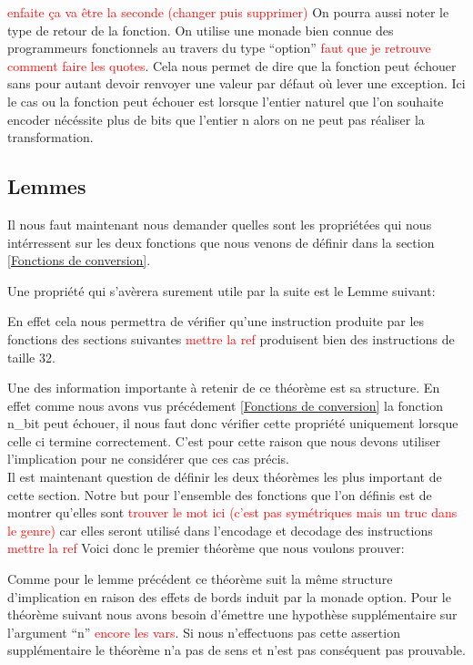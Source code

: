 \documentclass {article}
\newcommand{\codefrom}[3]
           {}
\theoremstyle{definition}
\theoremstyle{remark}
\newcommand{\todo}[1]{\textcolor{red}{#1}}
\begin{document}
\todo{enfaite ça va être la seconde (changer puis supprimer)}
On pourra aussi noter le type de retour de la fonction.
On utilise une monade bien connue des programmeurs fonctionnels au travers du type
``option'' \todo{faut que je retrouve comment faire les quotes}. Cela nous permet de
dire que la fonction peut échouer sans pour autant devoir renvoyer une valeur par
défaut où lever une exception. Ici le cas ou la fonction peut échouer est lorsque
l'entier naturel que l'on souhaite encoder nécéssite plus de bits que l'entier n alors
on ne peut pas réaliser la transformation.





\subsection{Lemmes}

Il nous faut maintenant nous demander quelles sont les propriétées qui nous intérressent sur
les deux fonctions que nous venons de définir dans la section \ref{Fonctions de conversion}.

Une propriété qui s'avèrera surement utile par la suite est le Lemme suivant:

En effet cela nous permettra de vérifier qu'une instruction produite par les fonctions
des sections suivantes \todo{mettre la ref} produisent bien des instructions de taille 32.

\codefrom{src}{binary}{size_n_bit}

Une des information importante à retenir de ce théorème est sa structure.
En effet comme nous avons vus précédement \ref{Fonctions de conversion} la
fonction n\_bit peut échouer, il nous faut donc vérifier cette propriété
uniquement lorsque celle ci termine correctement. C'est pour cette raison
que nous devons utiliser l'implication pour ne considérer que ces cas précis. \\

Il est maintenant question de définir les deux théorèmes les plus important de
cette section. Notre but pour l'ensemble des fonctions que l'on définis est de
montrer qu'elles sont \todo{trouver le mot ici (c'est pas symétriques mais un truc dans le genre)}
car elles seront utilisé dans l'encodage et decodage des instructions \todo{mettre la ref}
Voici donc le premier théorème que nous voulons prouver:

\codefrom{src}{binary}{nbitn}

Comme pour le lemme précédent ce théorème suit la même structure d'implication en raison des effets
de bords induit par la monade option.
Pour le théorème suivant nous avons besoin d'émettre une hypothèse supplémentaire sur l'argument
``n'' \todo{encore les vars}. Si nous n'effectuons pas cette assertion supplémentaire le
théorème n'a pas de sens et n'est pas conséquent pas prouvable.
\end{document}
